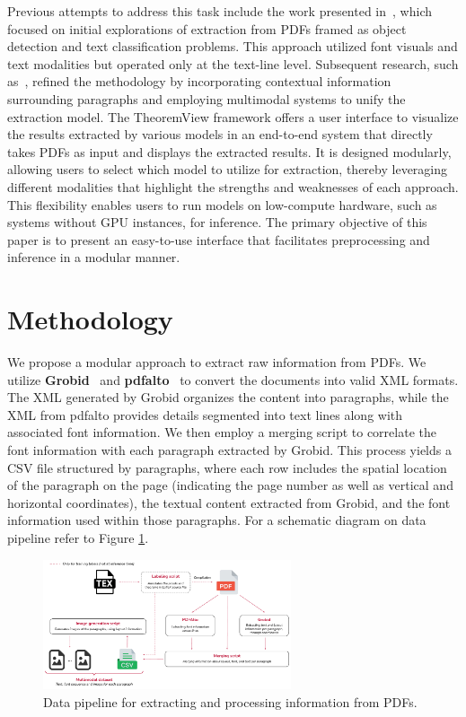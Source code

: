 \documentclass[runningheads]{llncs}
\begin{document}
Previous attempts to address this task include the work presented in~\cite{doceng_paper}, which focused on 
initial explorations of extraction from PDFs framed as object detection and text classification problems. 
This approach utilized font visuals and text modalities but operated only at the text-line level. Subsequent 
research, such as~\cite{mishra2024modularmultimodalmachinelearning}, refined the methodology by incorporating contextual information 
surrounding paragraphs and employing multimodal systems to unify the extraction model.
The TheoremView framework offers a user interface to visualize the results extracted by various models in 
an end-to-end system that directly takes PDFs as input and displays the extracted results. It is designed 
modularly, allowing users to select which model to utilize for extraction, thereby leveraging different 
modalities that highlight the strengths and weaknesses of each approach. This flexibility enables users 
to run models on low-compute hardware, such as systems without GPU instances, for inference. The primary 
objective of this paper is to present an easy-to-use interface that facilitates preprocessing and inference 
in a modular manner.

\section{Methodology}
We propose a modular approach to extract raw information from PDFs. We utilize \textbf{Grobid}~\cite{GROBID} and \textbf{pdfalto}~\cite{pdfalto} to convert 
the documents into valid XML formats. The XML generated by Grobid organizes the content into paragraphs, 
while the XML from pdfalto provides details segmented into text lines along with associated font information. 
We then employ a merging script to correlate the font information with each paragraph extracted by Grobid. 
This process yields a CSV file structured by paragraphs, where each row includes the spatial location of the 
paragraph on the page (indicating the page number as well as vertical and horizontal coordinates), the textual content 
extracted from Grobid, and the font information used within those paragraphs. For a schematic diagram on data pipeline
refer to Figure \ref{fig:datapipeline}.

\begin{figure}[h]
    \centering
    \includegraphics[width=0.65\textwidth]{images/preprocessing.pdf}
    \caption{Data pipeline for extracting and processing information from PDFs.}
    \label{fig:datapipeline}
\end{figure}
\end{document}
